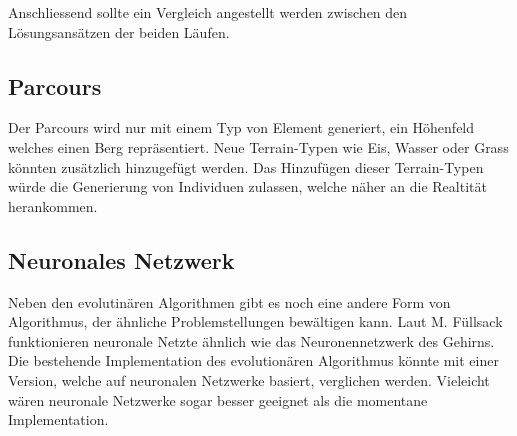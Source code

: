       Anschliessend sollte ein Vergleich angestellt werden zwischen den Lösungsansätzen der beiden Läufen.

    \subsection{Parcours}

      Der Parcours wird nur mit einem Typ von Element generiert, ein Höhenfeld welches einen Berg repräsentiert.
      Neue Terrain-Typen wie Eis, Wasser oder Grass könnten zusätzlich hinzugefügt werden.
      Das Hinzufügen dieser Terrain-Typen würde die Generierung von Individuen zulassen, welche näher an die Realtität herankommen.


    \subsection{Neuronales Netzwerk}

      Neben den evolutinären Algorithmen gibt es noch eine andere Form von Algorithmus, der ähnliche Problemstellungen bewältigen kann.
      Laut M. Füllsack~\cite{book:fullsack} funktionieren neuronale Netzte ähnlich wie das Neuronennetzwerk des Gehirns.
      Die bestehende Implementation des evolutionären Algorithmus könnte mit einer Version, welche auf neuronalen Netzwerke basiert, verglichen werden.
      Vieleicht wären neuronale Netzwerke sogar besser geeignet als die momentane Implementation.
